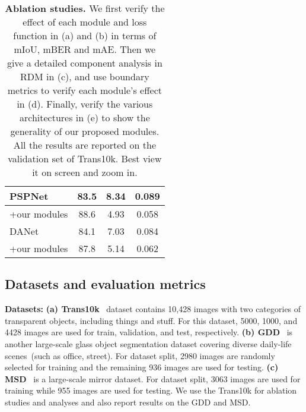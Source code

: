 \begin{table*}[t]
\begin{minipage}[!t]{\linewidth}
\begin{minipage}{.25\linewidth}
{{\begin{tabular}{l|c c c}
				\hline
				PSPNet~\cite{pspnet} & 83.5 & 8.34 & 0.089 \\
				\hline
				+our modules & 88.6 & 4.93 &  0.058 \\
				\hline
				DANet~\cite{DAnet} & 84.1 & 7.03 & 0.084 \\
				\hline
				+our modules & 87.8 & 5.14 & 0.062\\
				\hline
		\end{tabular}}}
		\end{minipage}
	\end{minipage}
	\vspace{-3mm}
	\caption{\small \textbf{Ablation studies.} We first verify the effect of each module and loss function in (a) and (b) in terms of mIoU, mBER and mAE. Then we give a detailed component analysis in RDM in (c), and use boundary metrics to verify each module's effect in (d). Finally, verify the various architectures in (e) to show the generality of our proposed modules. All the results are reported on the validation set of Trans10k. Best view it on screen and zoom in.}\label{tab:ablations}
	\vspace{-3mm}
\end{table*}



\subsection{Datasets and evaluation metrics}

\noindent \textbf{Datasets:} \textbf{(a) Trans10k}~\cite{trans10k_xieenze} dataset contains 10,428 images with two categories of transparent objects, including things and stuff. For this dataset, 5000, 1000, and 4428 images are used for train, validation, and test, respectively. 
\textbf{(b) GDD}~\cite{tranparent_gdnet} is another large-scale glass object segmentation dataset covering diverse daily-life scenes~(such as office, street). For dataset split, 2980 images are randomly selected for training and the remaining 936 images are used for testing.
\textbf{(c) MSD}~\cite{Mirror_net} is a large-scale mirror dataset. For dataset split, 3063 images are used for training while 955 images are used for testing.
We use the Trans10k for ablation studies and analyses and also report results on the GDD and MSD.

